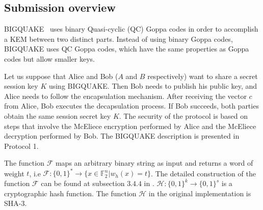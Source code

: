 \label{sec:attack}
\subsection{Submission overview}
BIGQUAKE~\cite{bardet2017big} uses binary Quasi-cyclic (QC) Goppa codes in order to accomplish a KEM between two distinct parts. Instead of using binary Goppa codes, BIGQUAKE uses QC Goppa codes, which have the same properties as Goppa codes but allow smaller keys.

Let us suppose that Alice and Bob ($A$ and $B$ respectively) want to share a secret session key $K$ using BIGQUAKE. Then Bob needs to publish his public key, and Alice needs to follow the encapsulation mechanism. After receiving the vector $c$ from Alice, Bob executes the decapsulation process. If Bob succeeds, both parties obtain the same session secret key $K$. The security of the protocol is based on steps that involve the McEliece encryption performed by Alice and the McEliece decryption performed by Bob. The BIGQUAKE description is presented in Protocol 1.

The function $\mathcal{F}$ maps an arbitrary binary string as input and returns a word of weight $t$, i.e $\mathcal{F}: \{0,1\}^* \to \{x \in \mathbb{F}^n_2 | w_h(x) = t\}$. The detailed construction of the function $\mathcal{F}$ can be found at subsection $3.4.4$ in \cite{bardet2017big}. $\mathcal{H} : \{0,1\}^k \to \{0,1\}^s$ is a cryptographic hash function. The function $\mathcal{H}$ in the original implementation is SHA-3. 


